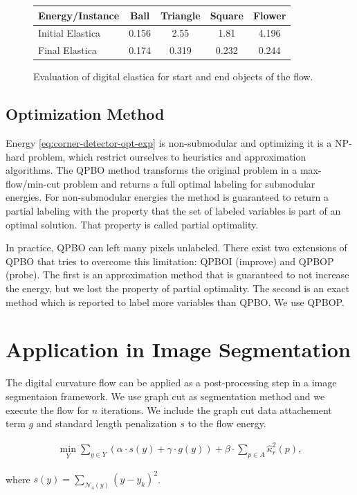 \documentclass[runningheads]{llncs}
\begin{document}
\begin{figure}[!ht]
\center
\begin{tabular}{l|c|c|c|c}
	Energy/Instance & Ball & Triangle & Square & Flower\\
	\hline
	Initial Elastica & 0.156 & 2.55 & 1.81 & 4.196 \\
	Final Elastica & 0.174 & 0.319 & 0.232 & 0.244
\end{tabular}
\caption{Evaluation of digital elastica for start and end objects of the flow.}
\label{tab:digital_glows_elastica_result}
\end{figure}

\subsection{Optimization Method}\label{sec:optimization_method}

	Energy \eqref{eq:corner-detector-opt-exp} is non-submodular and optimizing it is a NP-hard problem, which restrict ourselves to heuristics and approximation algorithms. The QPBO method \cite{kolmogorov07} transforms the original problem in a max-flow/min-cut problem and returns a full optimal labeling for submodular energies. For non-submodular energies the method is guaranteed to return a partial labeling with the property that the set of labeled variables is part of an optimal solution. That property is called partial optimality. 

	In practice, QPBO can left many pixels unlabeled. There exist two extensions of QPBO that tries to overcome this limitation: QPBOI (improve) and QPBOP (probe). The first is an approximation method that is guaranteed to not increase the energy, but we lost the property of partial optimality. The second is an exact method which is reported to label more variables than QPBO. We use QPBOP.
	
\section{Application in Image Segmentation}

The digital curvature flow can be applied as a post-processing step in a image segmentaion framework. We use graph cut \cite{boykov01} as segmentation method and we execute the flow for $n$ iterations. We include the graph cut data attachement term $g$ and standard length penalization $s$ to the flow energy.



\begin{align}			
	\min_{Y} \sum_{y \in Y}{\left( \alpha \cdot s(y) + \gamma \cdot g(y) \right)} + \beta \cdot \sum_{p \in A}{\hat{\kappa}_{r}^2(p)},
	\label{eq:boundary-correction-energy}
\end{align}
	
	where $s(y)=\sum_{\mathcal{N}_4(y)}{ (y-y_k) }^2$.
	


%
%
%


\end{document}
